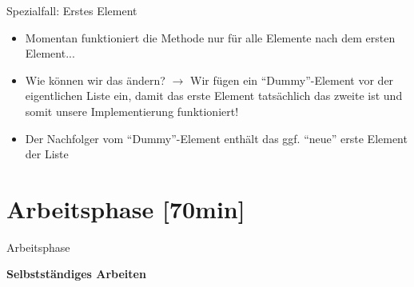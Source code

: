 \documentclass{../tuda-beamer}
\begin{document}
    \begin{frame}{Spezialfall: Erstes Element}
        \begin{itemize}
            \item Momentan funktioniert die Methode nur für alle Elemente nach dem ersten Element...
            \item Wie können wir das ändern? \(\rightarrow\) Wir fügen ein
            \enquote{Dummy}-Element vor der eigentlichen Liste ein, damit das erste Element
            tatsächlich das zweite ist und somit unsere Implementierung funktioniert!
            \item Der Nachfolger vom \enquote{Dummy}-Element enthält das ggf. \enquote{neue}
            erste Element der Liste
        \end{itemize}
    \end{frame}

    \begin{frame}[allowframebreaks]
        
    \end{frame}


    \section{Arbeitsphase [70min]}
    \label{sec:arbeitsphase}
    \begin{frame}[c]{Arbeitsphase}
        \begin{center}
            \textbf{\LARGE Selbstständiges Arbeiten}
        \end{center}
    \end{frame}
\end{document}
